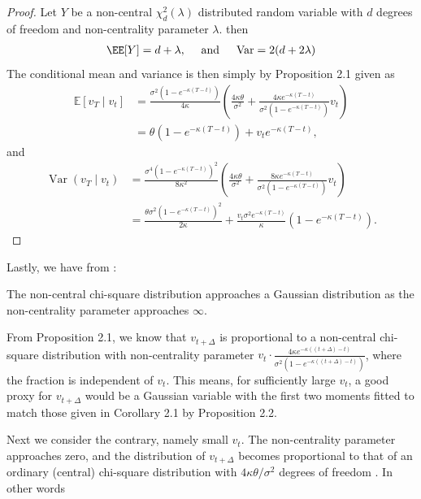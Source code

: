 \documentclass[11pt]{article}
\numberwithin{equation}{section}
\begin{document}
\begin{proof}
Let $Y$ be a non-central $\chi_d^2(\lambda)$ distributed random variable with $d$ degrees
of freedom and non-centrality parameter $\lambda$. then
\begin{align*}
    \EE[Y]=d+\lambda, \quad \text{ and } \quad \operatorname{Var}=2(d+2\lambda)
\end{align*}
The conditional mean and
variance is then simply by Proposition 2.1 given as
$$
\begin{aligned}
\mathbb{E}\left[v_T \mid v_t\right] & =\frac{\sigma^{2}\left(1-e^{-\kappa(T-t)}\right)}{4 \kappa}\left(\frac{4 \kappa \theta}{\sigma^{2}}+\frac{4 \kappa e^{-\kappa(T-t)}}{\sigma^{2}\left(1-e^{-\kappa(T-t)}\right)} v_t\right) \\
& =\theta\left(1-e^{-\kappa(T-t)}\right)+v_t e^{-\kappa(T-t)},
\end{aligned}
$$
and
$$
\begin{aligned}
\operatorname{Var}\left(v_T \mid v_t\right) & =\frac{\sigma^{4}\left(1-e^{-\kappa(T-t)}\right)^{2}}{8 \kappa^{2}}\left(\frac{4 \kappa \theta}{\sigma^{2}}+\frac{8 \kappa e^{-\kappa(T-t)}}{\sigma^{2}\left(1-e^{-\kappa(T-t)}\right)} v_t\right) \\
& =\frac{\theta \sigma^{2}\left(1-e^{-\kappa(T-t)}\right)^{2}}{2 \kappa}+\frac{v_t\sigma^{2} e^{-\kappa(T-t)}}{\kappa}\left(1-e^{-\kappa(T-t)}\right).
\end{aligned}
$$
\end{proof}

Lastly, we have from \cite{johnson1995continuous}:

\begin{proposition} 
The non-central
chi-square distribution approaches a Gaussian distribution as the non-centrality
parameter approaches $\infty$.
\end{proposition}
From Proposition 2.1, we know that $v_{t+\Delta}$
is proportional to a non-central chi-square distribution with non-centrality
parameter $v_t\cdot \frac{4 \kappa
e^{-\kappa((t+\Delta)-t)}}{\sigma^{2}\left(1-e^{-\kappa((t+\Delta)-t)}\right)}
$, where the fraction is independent of $v_t$. This means,
for sufficiently large $v_t$, a good proxy for $v_{t+\Delta}$ would be a
Gaussian variable with the first two moments fitted to match those given in
Corollary 2.1 by Proposition 2.2.

Next we consider the contrary, namely small $v_t$. The non-centrality parameter
approaches zero, and the distribution of $v_{t+\Delta}$ becomes proportional to
that of an ordinary (central) chi-square distribution with $4 \kappa \theta /
\sigma^{2}$ degrees of freedom \cite{johnson1995continuous}. In other words
\end{document}
